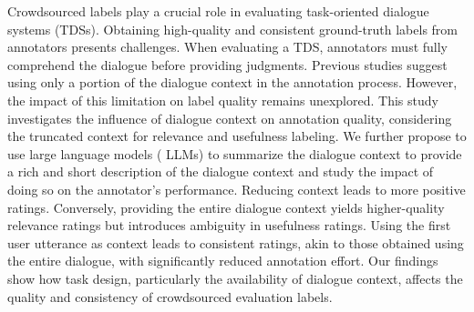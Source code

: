 Crowdsourced labels play a crucial role in evaluating task-oriented dialogue systems (TDSs). Obtaining high-quality and consistent ground-truth labels from annotators presents challenges. When evaluating a TDS, annotators must fully comprehend the dialogue before providing judgments. Previous studies suggest using only a portion of the dialogue context in the annotation process. However, the impact of this limitation on label quality remains unexplored. This study investigates the influence of dialogue context on annotation quality, considering the truncated context for relevance and usefulness labeling. We further propose to use large language models ( LLMs) to summarize the dialogue context to provide a rich and short description of the dialogue context and study the impact of doing so on the annotator’s performance. Reducing context leads to more positive ratings. Conversely, providing the entire dialogue context yields higher-quality relevance ratings but introduces ambiguity in usefulness ratings. Using the first user utterance as context leads to consistent ratings, akin to those obtained using the entire dialogue, with significantly reduced annotation effort. Our findings show how task design, particularly the availability of dialogue context, affects the quality and consistency of crowdsourced evaluation labels.